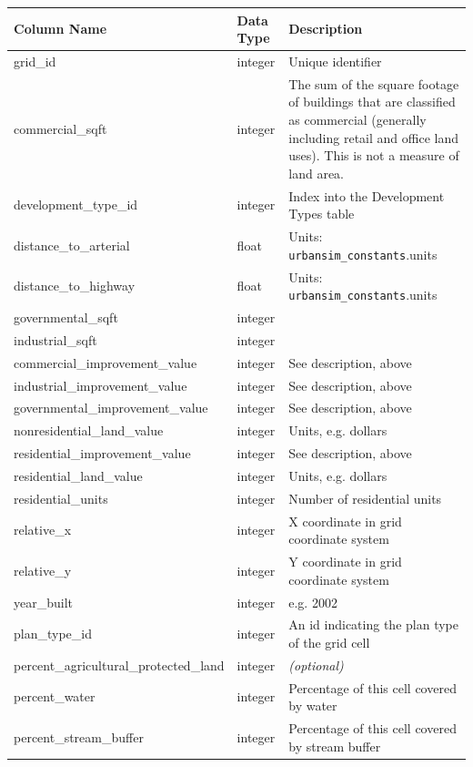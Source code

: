 \begin{tabular}{|p{2in}|l|p{3.5in}|}
\hline
\textbf{Column Name} & \textbf{Data Type} & \textbf{Description} \\
\hline
grid_id & integer & Unique identifier  \\
\hline
commercial_sqft & integer & The sum of the square footage of buildings that are classified as commercial (generally including retail and office land uses). This is not a measure of land area.  \\
\hline
development_type_id & integer & Index into the Development Types table  \\
\hline
distance_to_arterial & float &  Units: \verb|urbansim_constants|.units \\
\hline
distance_to_highway & float &  Units: \verb|urbansim_constants|.units \\
\hline
governmental_sqft & integer & \\
\hline
industrial_sqft & integer & \\
\hline
commercial_improvement_value & integer & See description, above  \\
\hline
industrial_improvement_value & integer & See description, above  \\
\hline
governmental_improvement_value & integer & See description, above  \\
\hline
nonresidential_land_value & integer & Units, e.g. dollars  \\
\hline
residential_improvement_value & integer & See description, above  \\
\hline
residential_land_value & integer & Units, e.g. dollars  \\
\hline
residential_units & integer & Number of residential units  \\
\hline
relative_x & integer & X coordinate in grid coordinate system  \\
\hline
relative_y & integer & Y coordinate in grid coordinate system  \\
\hline
year_built & integer & e.g. 2002  \\
\hline
plan_type_id & integer & An id indicating the plan type of the grid cell  \\
\hline
percent_agricultural_protected_land & integer & \emph{(optional) }
\\
\hline
percent_water & integer & Percentage of this cell covered by water  \\
\hline
percent_stream_buffer & integer & Percentage of this cell covered by stream buffer  \\

\end{tabular}
